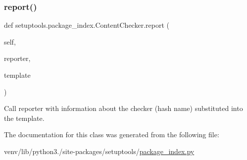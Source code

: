 \subsubsection{\texorpdfstring{report()}{report()}}
{\footnotesize\ttfamily def setuptools.\+package\+\_\+index.\+Content\+Checker.\+report (\begin{DoxyParamCaption}\item[{}]{self,  }\item[{}]{reporter,  }\item[{}]{template }\end{DoxyParamCaption})}

\begin{DoxyVerb}Call reporter with information about the checker (hash name)
substituted into the template.
\end{DoxyVerb}
 

The documentation for this class was generated from the following file\+:\begin{DoxyCompactItemize}
\item 
venv/lib/python3./site-\/packages/setuptools/\hyperlink{package__index_8py}{package\+\_\+index.\+py}\end{DoxyCompactItemize}
